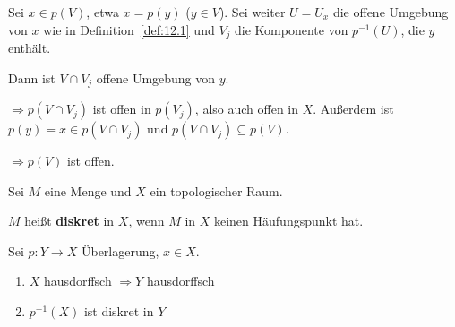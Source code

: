 \begin{beweis}
    Sei $x \in p(V)$, etwa $x=p(y)$ ($y \in V$).
    Sei weiter $U = U_x$ die offene Umgebung von $x$ wie in Definition~\ref{def:12.1}
    und $V_j$ die Komponente von $p^{-1}(U)$, die $y$ enthält.

    Dann ist $V \cap V_j$ offene Umgebung von $y$.

    $\Rightarrow p(V \cap V_j)$ ist offen in $p(V_j)$, also auch offen
    in $X$. Außerdem ist $p(y) = x \in p(V \cap V_j)$ und
    $p(V \cap V_j) \subseteq p(V)$.

    $\Rightarrow p(V)$ ist offen.
\end{beweis}

\begin{definition}
    Sei $M$ eine Menge und $X$ ein topologischer Raum.

    $M$ heißt \textbf{diskret} in $X$, wenn $M$ in $X$ keinen 
    Häufungspunkt hat.
\end{definition}

\begin{korollar} %
    Sei $p: Y \rightarrow X$ Überlagerung, $x \in X$.
    \begin{enumerate}[label=\alph*)]
        \item $X$ hausdorffsch $\Rightarrow Y$ hausdorffsch
        \item $p^{-1}(X)$ ist diskret in $Y$
    \end{enumerate}
\end{korollar}

